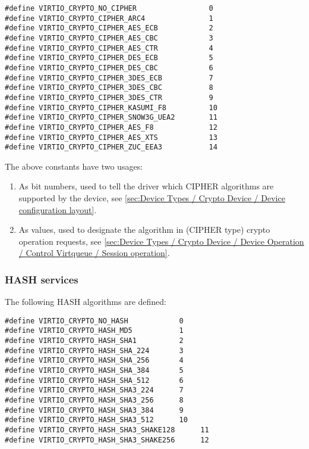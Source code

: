 \begin{lstlisting}
#define VIRTIO_CRYPTO_NO_CIPHER                 0
#define VIRTIO_CRYPTO_CIPHER_ARC4               1
#define VIRTIO_CRYPTO_CIPHER_AES_ECB            2
#define VIRTIO_CRYPTO_CIPHER_AES_CBC            3
#define VIRTIO_CRYPTO_CIPHER_AES_CTR            4
#define VIRTIO_CRYPTO_CIPHER_DES_ECB            5
#define VIRTIO_CRYPTO_CIPHER_DES_CBC            6
#define VIRTIO_CRYPTO_CIPHER_3DES_ECB           7
#define VIRTIO_CRYPTO_CIPHER_3DES_CBC           8
#define VIRTIO_CRYPTO_CIPHER_3DES_CTR           9
#define VIRTIO_CRYPTO_CIPHER_KASUMI_F8          10
#define VIRTIO_CRYPTO_CIPHER_SNOW3G_UEA2        11
#define VIRTIO_CRYPTO_CIPHER_AES_F8             12
#define VIRTIO_CRYPTO_CIPHER_AES_XTS            13
#define VIRTIO_CRYPTO_CIPHER_ZUC_EEA3           14
\end{lstlisting}

The above constants have two usages:
\begin{enumerate}
\item As bit numbers, used to tell the driver which CIPHER algorithms
are supported by the device, see \ref{sec:Device Types / Crypto Device / Device configuration layout}.
\item As values, used to designate the algorithm in (CIPHER type) crypto
operation requests, see \ref{sec:Device Types / Crypto Device / Device Operation / Control Virtqueue / Session operation}.
\end{enumerate}

\subsubsection{HASH services}\label{sec:Device Types / Crypto Device / Supported crypto services / HASH services}

The following HASH algorithms are defined:

\begin{lstlisting}
#define VIRTIO_CRYPTO_NO_HASH            0
#define VIRTIO_CRYPTO_HASH_MD5           1
#define VIRTIO_CRYPTO_HASH_SHA1          2
#define VIRTIO_CRYPTO_HASH_SHA_224       3
#define VIRTIO_CRYPTO_HASH_SHA_256       4
#define VIRTIO_CRYPTO_HASH_SHA_384       5
#define VIRTIO_CRYPTO_HASH_SHA_512       6
#define VIRTIO_CRYPTO_HASH_SHA3_224      7
#define VIRTIO_CRYPTO_HASH_SHA3_256      8
#define VIRTIO_CRYPTO_HASH_SHA3_384      9
#define VIRTIO_CRYPTO_HASH_SHA3_512      10
#define VIRTIO_CRYPTO_HASH_SHA3_SHAKE128      11
#define VIRTIO_CRYPTO_HASH_SHA3_SHAKE256      12
\end{lstlisting}

